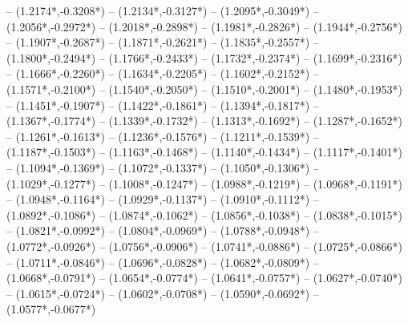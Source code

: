 {	-- ({1.2174*\dx},{-0.3208*\dy})
	-- ({1.2134*\dx},{-0.3127*\dy})
	-- ({1.2095*\dx},{-0.3049*\dy})
	-- ({1.2056*\dx},{-0.2972*\dy})
	-- ({1.2018*\dx},{-0.2898*\dy})
	-- ({1.1981*\dx},{-0.2826*\dy})
	-- ({1.1944*\dx},{-0.2756*\dy})
	-- ({1.1907*\dx},{-0.2687*\dy})
	-- ({1.1871*\dx},{-0.2621*\dy})
	-- ({1.1835*\dx},{-0.2557*\dy})
	-- ({1.1800*\dx},{-0.2494*\dy})
	-- ({1.1766*\dx},{-0.2433*\dy})
	-- ({1.1732*\dx},{-0.2374*\dy})
	-- ({1.1699*\dx},{-0.2316*\dy})
	-- ({1.1666*\dx},{-0.2260*\dy})
	-- ({1.1634*\dx},{-0.2205*\dy})
	-- ({1.1602*\dx},{-0.2152*\dy})
	-- ({1.1571*\dx},{-0.2100*\dy})
	-- ({1.1540*\dx},{-0.2050*\dy})
	-- ({1.1510*\dx},{-0.2001*\dy})
	-- ({1.1480*\dx},{-0.1953*\dy})
	-- ({1.1451*\dx},{-0.1907*\dy})
	-- ({1.1422*\dx},{-0.1861*\dy})
	-- ({1.1394*\dx},{-0.1817*\dy})
	-- ({1.1367*\dx},{-0.1774*\dy})
	-- ({1.1339*\dx},{-0.1732*\dy})
	-- ({1.1313*\dx},{-0.1692*\dy})
	-- ({1.1287*\dx},{-0.1652*\dy})
	-- ({1.1261*\dx},{-0.1613*\dy})
	-- ({1.1236*\dx},{-0.1576*\dy})
	-- ({1.1211*\dx},{-0.1539*\dy})
	-- ({1.1187*\dx},{-0.1503*\dy})
	-- ({1.1163*\dx},{-0.1468*\dy})
	-- ({1.1140*\dx},{-0.1434*\dy})
	-- ({1.1117*\dx},{-0.1401*\dy})
	-- ({1.1094*\dx},{-0.1369*\dy})
	-- ({1.1072*\dx},{-0.1337*\dy})
	-- ({1.1050*\dx},{-0.1306*\dy})
	-- ({1.1029*\dx},{-0.1277*\dy})
	-- ({1.1008*\dx},{-0.1247*\dy})
	-- ({1.0988*\dx},{-0.1219*\dy})
	-- ({1.0968*\dx},{-0.1191*\dy})
	-- ({1.0948*\dx},{-0.1164*\dy})
	-- ({1.0929*\dx},{-0.1137*\dy})
	-- ({1.0910*\dx},{-0.1112*\dy})
	-- ({1.0892*\dx},{-0.1086*\dy})
	-- ({1.0874*\dx},{-0.1062*\dy})
	-- ({1.0856*\dx},{-0.1038*\dy})
	-- ({1.0838*\dx},{-0.1015*\dy})
	-- ({1.0821*\dx},{-0.0992*\dy})
	-- ({1.0804*\dx},{-0.0969*\dy})
	-- ({1.0788*\dx},{-0.0948*\dy})
	-- ({1.0772*\dx},{-0.0926*\dy})
	-- ({1.0756*\dx},{-0.0906*\dy})
	-- ({1.0741*\dx},{-0.0886*\dy})
	-- ({1.0725*\dx},{-0.0866*\dy})
	-- ({1.0711*\dx},{-0.0846*\dy})
	-- ({1.0696*\dx},{-0.0828*\dy})
	-- ({1.0682*\dx},{-0.0809*\dy})
	-- ({1.0668*\dx},{-0.0791*\dy})
	-- ({1.0654*\dx},{-0.0774*\dy})
	-- ({1.0641*\dx},{-0.0757*\dy})
	-- ({1.0627*\dx},{-0.0740*\dy})
	-- ({1.0615*\dx},{-0.0724*\dy})
	-- ({1.0602*\dx},{-0.0708*\dy})
	-- ({1.0590*\dx},{-0.0692*\dy})
	-- ({1.0577*\dx},{-0.0677*\dy})
}
